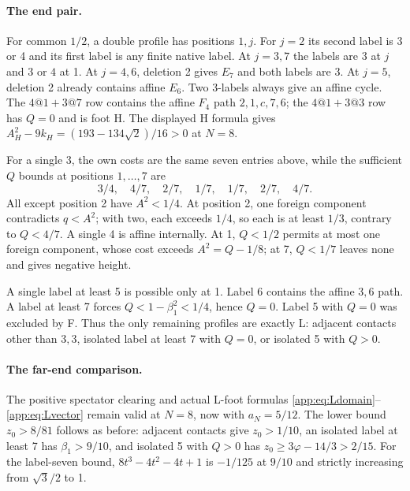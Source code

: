 \documentclass[11pt]{article}
\theoremstyle{definition}
\theoremstyle{remark}
\newcommand{\ph}{\varphi}
\begin{document}
\paragraph{The end pair.}
For common $1/2$, a double profile has positions $1,j$.
For $j=2$ its second label is 3 or 4 and its first label is any
finite native label. At $j=3,7$ the labels are $3$ at $j$ and
$3$ or $4$ at 1. At $j=4,6$, deletion 2 gives $E_7$ and
both labels are 3. At $j=5$, deletion 2 already contains affine
$E_6$. Two 3-labels always give an affine cycle. The
$4@1+3@7$ row contains the affine $F_4$ path
$2,1,c,7,6$; the $4@1+3@3$ row has $Q=0$ and is foot H.
The displayed H formula gives
$A_H^2-9k_H=(193-134\sqrt2)/16>0$ at $N=8$.

For a single 3, the own costs are the same seven entries above,
while the sufficient $Q$ bounds at positions $1,\ldots,7$ are
\[
 3/4,\quad4/7,\quad2/7,\quad1/7,\quad1/7,\quad2/7,\quad4/7.
\]
All except position 2 have $A^2<1/4$. At position 2, one foreign
component contradicts $q<A^2$; with two, each exceeds $1/4$,
so each is at least $1/3$, contrary to $Q<4/7$. A single 4 is
affine internally. At 1, $Q<1/2$ permits at most one foreign
component, whose cost exceeds $A^2=Q-1/8$; at 7, $Q<1/7$
leaves none and gives negative height.

A single label at least 5 is possible only at 1. Label 6
contains the affine $3,6$ path. A label at least 7 forces
$Q<1-\beta_1^2<1/4$, hence $Q=0$. Label 5 with $Q=0$ was
excluded by F. Thus the only remaining profiles are exactly L:
adjacent contacts other than $3,3$, isolated label at least 7
with $Q=0$, or isolated 5 with $Q>0$.

\paragraph{The far-end comparison.}
The positive spectator clearing and actual L-foot formulas
\eqref{app:eq:Ldomain}--\eqref{app:eq:Lvector} remain valid at $N=8$,
now with $a_N=5/12$. The lower bound $z_0>8/81$ follows as
before: adjacent contacts give $z_0>1/10$, an isolated label
at least 7 has $\beta_1>9/10$, and isolated 5 with $Q>0$
has $z_0\ge3\ph-14/3>2/15$. For the label-seven bound,
$8t^3-4t^2-4t+1$ is $-1/125$ at $9/10$ and strictly
increasing from $\sqrt3/2$ to 1.
\end{document}
